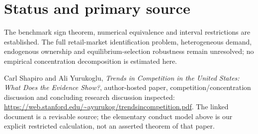 \documentclass[11pt]{article}
\begin{document}
\section{Status and primary source}
The benchmark sign theorem, numerical equivalence and interval restrictions are established. The full retail-market identification problem, heterogeneous demand, endogenous ownership and equilibrium-selection robustness remain unresolved; no empirical concentration decomposition is estimated here.

Carl Shapiro and Ali Yurukoglu, \emph{Trends in Competition in the United States: What Does the Evidence Show?}, author-hosted paper, competition/concentration discussion and concluding research discussion inspected:
\url{https://web.stanford.edu/~ayurukog/trendsincompetition.pdf}. The linked document is a revisable source; the elementary conduct model above is our explicit restricted calculation, not an asserted theorem of that paper.
\end{document}
